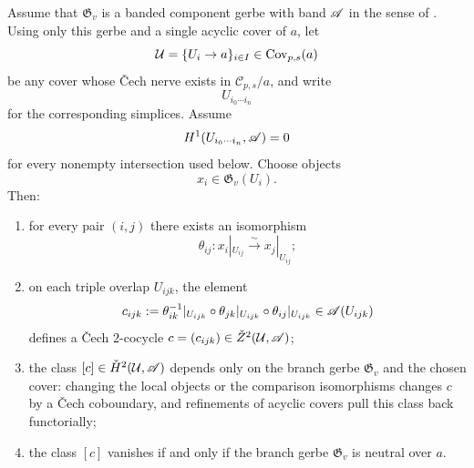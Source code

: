 \begin{proposition}\label{thm:cech-bridge-compatible-realizations}
Assume that $\mathfrak G_v$ is a banded component gerbe with band $\mathscr{A}$ in the sense of . Using only this gerbe and a single acyclic cover of $a$, let
\[
\mathcal U=\{U_i\to a\}_{i\in I}\in \mathrm{Cov}_{p,s}(a)
\]
be any cover whose \v{C}ech nerve exists in $\mathcal C_{p,s}/a$, and write
\[
U_{i_0\cdots i_n}
\]
for the corresponding simplices. Assume
\[
H^1(U_{i_0\cdots i_n},\mathscr{A})=0
\]
for every nonempty intersection used below. Choose objects
\[
x_i\in \mathfrak G_v(U_i).
\]
Then:
\begin{enumerate}[label=(\roman*),nosep]
\item for every pair $(i,j)$ there exists an isomorphism
\[
\theta_{ij}:x_i|_{U_{ij}}\xrightarrow{\sim} x_j|_{U_{ij}};
\]
\item on each triple overlap $U_{ijk}$, the element
\[
c_{ijk}:=\theta_{ik}^{-1}|_{U_{ijk}}\circ \theta_{jk}|_{U_{ijk}}\circ \theta_{ij}|_{U_{ijk}}
\in \mathscr{A}(U_{ijk})
\]
defines a \v{C}ech $2$-cocycle $c=(c_{ijk})\in \check Z^2(\mathcal U,\mathscr{A})$;
\item the class $[c]\in \check H^2(\mathcal U,\mathscr{A})$ depends only on the branch gerbe $\mathfrak G_v$ and the chosen cover: changing the local objects or the comparison isomorphisms changes $c$ by a \v{C}ech coboundary, and refinements of acyclic covers pull this class back functorially;
\item the class $[c]$ vanishes if and only if the branch gerbe $\mathfrak G_v$ is neutral over $a$.
\end{enumerate}
\end{proposition}

